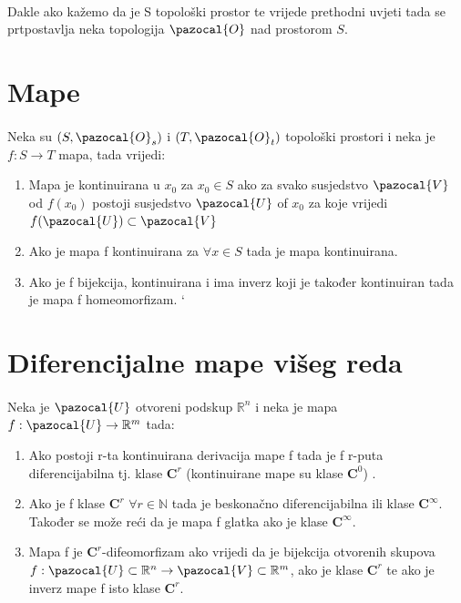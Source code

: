 \documentclass[times, utf8, diplomski]{fer}
\newcommand{\Oa}{\pazocal{O}}
\newcommand{\Va}{\pazocal{V}}
\newcommand{\Ua}{\pazocal{U}}
\begin{document}
	\paragraph{}Dakle ako kažemo da je S topološki prostor te vrijede prethodni uvjeti tada se prtpostavlja neka topologija $\Oa$ nad prostorom $S$.

\newpage
\clearpage

\section{Mape}

	\paragraph{}Neka su $(S, \Oa_s)$ i $(T, \Oa_t)$ topološki prostori i neka je $f:S \rightarrow T$ mapa, tada vrijedi:
	\begin{enumerate}
		\item Mapa je kontinuirana u $x_0$ za $x_0 \in S$ ako za svako susjedstvo $\Va$ od $f(x_0)$ postoji susjedstvo $\Ua$ of $x_0$ za koje vrijedi $f(\Ua)\subset\Va$ 
		\item Ako je mapa f kontinuirana za $\forall x \in S$ tada je mapa kontinuirana.
		\item Ako je f bijekcija, kontinuirana i ima inverz koji je također kontinuiran tada je mapa f homeomorfizam.
`	\end{enumerate}
	
\section{Diferencijalne mape višeg reda}

	\paragraph{} Neka je $\Ua$ otvoreni podskup $\mathbb{R}^n$ i neka je mapa $f: \Ua \rightarrow \mathbb{R}^m$ tada:
	\begin{enumerate}
		\item Ako postoji r-ta kontinuirana derivacija mape f tada je f r-puta diferencijabilna tj. klase $\boldsymbol{C}^r$ (kontinuirane mape su klase $\boldsymbol{C}^0$) .
		\item Ako je f klase $\boldsymbol{C}^r$ $\forall r \in \mathbb{N}$ tada je beskonačno diferencijabilna ili klase $\boldsymbol{C}^\infty$. Također se može reći da je mapa f glatka ako je klase $\boldsymbol{C}^\infty$.
		\item Mapa f je $\boldsymbol{C}^r$-difeomorfizam ako vrijedi da je bijekcija otvorenih skupova $f:\Ua \subset \mathbb{R}^n \rightarrow \Va \subset \mathbb{R}^m$, ako je klase $\boldsymbol{C}^r$ te ako je inverz mape f isto klase $\boldsymbol{C}^r$.
	\end{enumerate}
	
\end{document}
